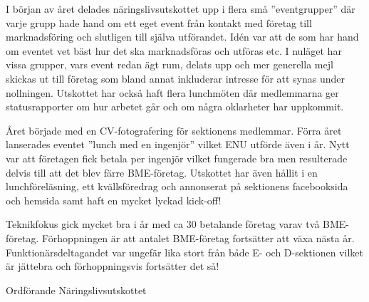 \documentclass[../_main/handlingar.tex]{subfiles}
\begin{document}
I början av året delades näringslivsutskottet upp i flera små ”eventgrupper” där varje grupp hade hand om ett eget event från kontakt med företag till marknadsföring och slutligen till själva utförandet. Idén var att de som har hand om eventet vet bäst hur det ska marknadsföras och utföras etc. I nuläget har vissa grupper, vars event redan ägt rum, delats upp och mer generella mejl skickas ut till företag som bland annat inkluderar intresse för att synas under nollningen. Utskottet har också haft flera lunchmöten där medlemmarna ger statusrapporter om hur arbetet går och om några oklarheter har uppkommit.

Året började med en CV-fotografering för sektionens medlemmar.  Förra året lanserades eventet ”lunch med en ingenjör” vilket ENU utförde även i år. Nytt var att företagen fick betala per ingenjör vilket fungerade bra men resulterade delvis till att det blev färre BME-företag. Utskottet har även hållit i en lunchföreläsning, ett kvällsföredrag och annonserat på sektionens facebooksida och hemsida samt haft en mycket lyckad kick-off!

Teknikfokus gick mycket bra i år med ca 30 betalande företag varav två BME-företag. Förhoppningen är att antalet BME-företag fortsätter att växa nästa år. Funktionärsdeltagandet var ungefär lika stort från både E- och D-sektionen vilket är jättebra och förhoppningsvis fortsätter det så!
\begin{signatures}{1}
    \mvh
    \signature{Isabella Hansen}{Ordförande Näringslivsutskottet}
\end{signatures}
\end{document}
